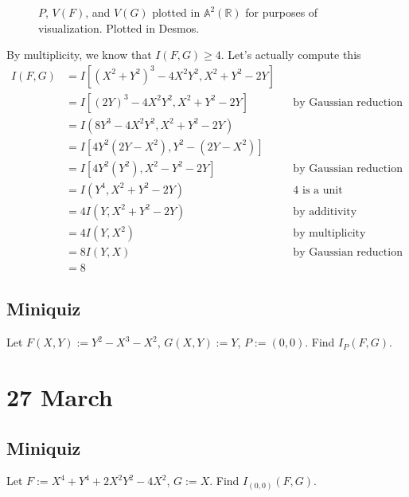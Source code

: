 \documentclass[12pt]{article}
\newcommand{\real}{\mathbb{R}}
\theoremstyle{definition}
\begin{document}
\begin{enumerate}
\begin{figure}[H]
        \caption{$P$, $V(F)$, and $V(G)$ plotted in $\mathbb{A}^2(\real)$ for purposes of visualization. Plotted in Desmos.}
    \end{figure}
    By multiplicity, we know that $I(F,G)\geq4$. Let's actually compute this
    \begin{align*}
        I(F,G)&=I[(X^2+Y^2)^3-4X^2Y^2,X^2+Y^2-2Y]\\
        &=I[(2Y)^3-4X^2Y^2,X^2+Y^2-2Y]&&\text{by Gaussian reduction}\\
        &=I(8Y^3-4X^2Y^2,X^2+Y^2-2Y)\\
        &=I[4Y^2(2Y-X^2),Y^2-(2Y-X^2)]\\
        &=I[4Y^2(Y^2),X^2-Y^2-2Y]&&\text{by Gaussian reduction}\\
        &=I(Y^4,X^2+Y^2-2Y)&&\text{4 is a unit}\\
        &=4I(Y,X^2+Y^2-2Y)&&\text{by additivity}\\
        &=4I(Y,X^2)&&\text{by multiplicity}\\
        &=8I(Y,X)&&\text{by Gaussian reduction}\\
        &=\boxed{8}
    \end{align*}
\end{enumerate}
\subsection{Miniquiz}
Let $F(X,Y):=Y^2-X^3-X^2$, $G(X,Y):=Y$, $P:=(0,0)$. Find $I_P(F,G)$.
\section{27 March}
\subsection{Miniquiz}
Let $F:=X^4+Y^4+2X^2Y^2-4X^2$, $G:=X$. Find $I_{(0,0)}(F,G)$.
\end{document}
